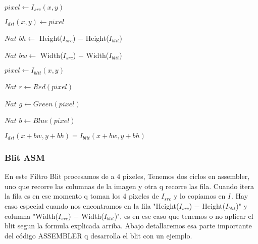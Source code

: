 \begin{algorithm}[H]
  \begin{algorithmic}[1]
		
			  
			  \STATE $pixel \gets I_{src}(x,y)$
			  
			  \STATE $I_{dst}(x,y) \gets pixel$
			  
			\ENDFOR

		 \ENDFOR
		 
		\STATE $Nat$ $ bh \gets $ Height($I_{src}$) $-$ Height($I_{blit}$)
			  
		\STATE $Nat$ $ bw \gets $ Width($I_{src}$) $-$ Width($I_{blit}$)


			  
			  \STATE $pixel \gets I_{blit}(x,y)$
			  
			  \STATE $Nat$ $ r \gets Red(pixel) $
			  
			  \STATE $Nat$ $g \gets Green(pixel)$
			  
			  \STATE $Nat$ $ b \gets Blue(pixel)$


				\STATE $I_{dst}(x+bw,y+bh) = I_{blit}(x+bw,y+bh)$ 
			  \ENDIF
			  
			\ENDFOR

		 \ENDFOR


  \end{algorithmic}
  \caption{$blit (I_{src}, I_{dst}, I_{blit})$}
  \label{alg:blit}
\end{algorithm}

\subsubsection*{Blit ASM}


En este Filtro Blit procesamos de a 4 pixeles, Tenemos dos ciclos en assembler, uno que recorre las columnas de la imagen y otra q recorre las fila.
Cuando itera la fila es en ese momento q toman los 4 pixeles de $I_{src}$ y lo copiamos en $I_{}$.
Hay caso especial cuando nos encontramos en la fila "Height($I_{src}$) $-$ Height($I_{blit}$)" y columna "Width($I_{src}$) $-$ Width($I_{blit}$)", es en ese caso que tenemos o no aplicar el blit segun la formula explicada arriba.
Abajo detallaremos esa parte importante del código ASSEMBLER q desarrolla el blit con un ejemplo.	

